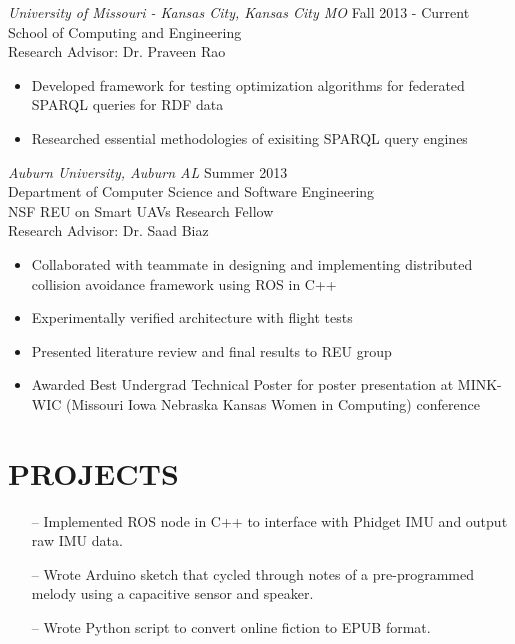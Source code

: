 \documentclass[line,margin]{res}
\begin{document}
\begin{resume}
		
		{\sl University of Missouri - Kansas City, Kansas City MO} \hfill Fall 2013 - Current \\
		School of Computing and Engineering \\
		Research Advisor: Dr. Praveen Rao
		 \begin{itemize} [leftmargin=5mm]  \itemsep -2pt %
		 \item  Developed framework for testing optimization algorithms for federated SPARQL queries for RDF data
		\item   Researched essential methodologies of exisiting SPARQL query engines 
		\end{itemize}


		{\sl Auburn University, Auburn AL}  \hfill  Summer 2013\\
		Department of Computer Science and Software Engineering  \\
		NSF REU on Smart UAVs Research Fellow \\
		Research Advisor: Dr. Saad Biaz
                 \begin{itemize}[leftmargin=5mm]  \itemsep -2pt %
		 \item Collaborated with teammate in designing and implementing distributed collision avoidance framework using ROS in C++ 
		 \item Experimentally verified architecture with flight tests 
		 \item Presented literature review and final results to REU group
		 \item Awarded Best Undergrad Technical Poster for poster presentation at MINK-WIC (Missouri Iowa Nebraska Kansas Women in Computing) conference
                 \end{itemize} 

\section {PROJECTS}
                 \begin{itemize} [leftmargin=5mm]  \itemsep -2pt %
                 \item[--] Implemented ROS node in C++ to interface with Phidget IMU and output raw IMU data. 
                 \item[--] Wrote Arduino sketch that cycled through notes of a pre-programmed melody using a capacitive sensor 	and speaker.
                 \item[--] Wrote Python script to convert online fiction to EPUB format. 
                 \end{itemize} 



\end{resume}
\end{document}
